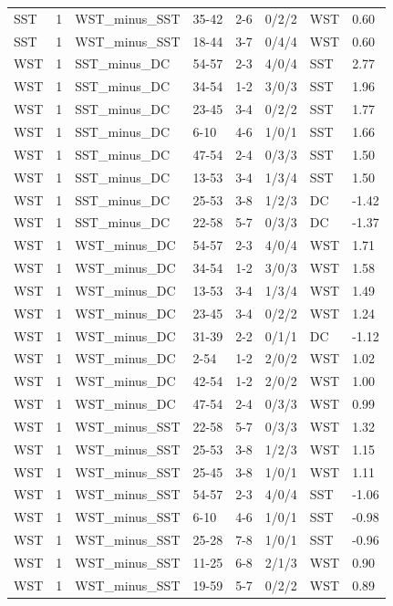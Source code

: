 \begin{table}[!h]
\begin{tabular}[t]{lrllllll}
SST & 1 & WST_minus_SST & 35-42 & 2-6 & 0/2/2 & WST & 0.60\\
SST & 1 & WST_minus_SST & 18-44 & 3-7 & 0/4/4 & WST & 0.60\\
WST & 1 & SST_minus_DC & 54-57 & 2-3 & 4/0/4 & SST & 2.77\\
\addlinespace
WST & 1 & SST_minus_DC & 34-54 & 1-2 & 3/0/3 & SST & 1.96\\
WST & 1 & SST_minus_DC & 23-45 & 3-4 & 0/2/2 & SST & 1.77\\
WST & 1 & SST_minus_DC & 6-10 & 4-6 & 1/0/1 & SST & 1.66\\
WST & 1 & SST_minus_DC & 47-54 & 2-4 & 0/3/3 & SST & 1.50\\
WST & 1 & SST_minus_DC & 13-53 & 3-4 & 1/3/4 & SST & 1.50\\
\addlinespace
WST & 1 & SST_minus_DC & 25-53 & 3-8 & 1/2/3 & DC & -1.42\\
WST & 1 & SST_minus_DC & 22-58 & 5-7 & 0/3/3 & DC & -1.37\\
WST & 1 & WST_minus_DC & 54-57 & 2-3 & 4/0/4 & WST & 1.71\\
WST & 1 & WST_minus_DC & 34-54 & 1-2 & 3/0/3 & WST & 1.58\\
WST & 1 & WST_minus_DC & 13-53 & 3-4 & 1/3/4 & WST & 1.49\\
\addlinespace
WST & 1 & WST_minus_DC & 23-45 & 3-4 & 0/2/2 & WST & 1.24\\
WST & 1 & WST_minus_DC & 31-39 & 2-2 & 0/1/1 & DC & -1.12\\
WST & 1 & WST_minus_DC & 2-54 & 1-2 & 2/0/2 & WST & 1.02\\
WST & 1 & WST_minus_DC & 42-54 & 1-2 & 2/0/2 & WST & 1.00\\
WST & 1 & WST_minus_DC & 47-54 & 2-4 & 0/3/3 & WST & 0.99\\
\addlinespace
WST & 1 & WST_minus_SST & 22-58 & 5-7 & 0/3/3 & WST & 1.32\\
WST & 1 & WST_minus_SST & 25-53 & 3-8 & 1/2/3 & WST & 1.15\\
WST & 1 & WST_minus_SST & 25-45 & 3-8 & 1/0/1 & WST & 1.11\\
WST & 1 & WST_minus_SST & 54-57 & 2-3 & 4/0/4 & SST & -1.06\\
WST & 1 & WST_minus_SST & 6-10 & 4-6 & 1/0/1 & SST & -0.98\\
\addlinespace
WST & 1 & WST_minus_SST & 25-28 & 7-8 & 1/0/1 & SST & -0.96\\
WST & 1 & WST_minus_SST & 11-25 & 6-8 & 2/1/3 & WST & 0.90\\
WST & 1 & WST_minus_SST & 19-59 & 5-7 & 0/2/2 & WST & 0.89\\
\bottomrule
\end{tabular}
\end{table}
